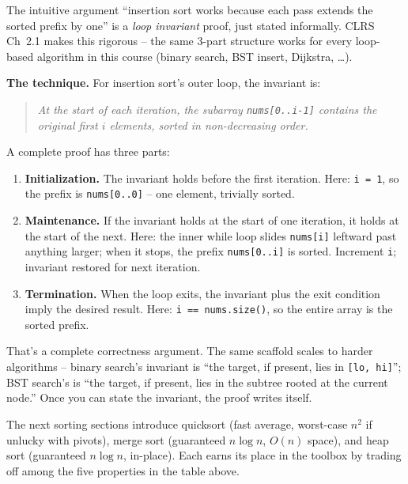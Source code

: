 \documentclass[11pt]{article}
\begin{document}
\begin{notebox}
The intuitive argument ``insertion sort works because each pass
extends the sorted prefix by one'' is a \emph{loop invariant}
proof, just stated informally. CLRS Ch~2.1 makes this rigorous --
the same 3-part structure works for every loop-based algorithm in
this course (binary search, BST insert, Dijkstra, \ldots).

\textbf{The technique.} For insertion sort's outer loop, the
invariant is:

\begin{quote}
\emph{At the start of each iteration, the subarray
\texttt{nums[0..i-1]} contains the original first $i$ elements,
sorted in non-decreasing order.}
\end{quote}

A complete proof has three parts:
\begin{enumerate}[leftmargin=*,noitemsep]
  \item \textbf{Initialization.} The invariant holds before the
        first iteration. Here: \texttt{i = 1}, so the prefix is
        \texttt{nums[0..0]} -- one element, trivially sorted.
  \item \textbf{Maintenance.} If the invariant holds at the start
        of one iteration, it holds at the start of the next. Here:
        the inner while loop slides \texttt{nums[i]} leftward past
        anything larger; when it stops, the prefix
        \texttt{nums[0..i]} is sorted. Increment \texttt{i};
        invariant restored for next iteration.
  \item \textbf{Termination.} When the loop exits, the invariant
        plus the exit condition imply the desired result. Here:
        \texttt{i == nums.size()}, so the entire array is the
        sorted prefix.
\end{enumerate}

That's a complete correctness argument. The same scaffold scales
to harder algorithms -- binary search's invariant is ``the target,
if present, lies in \texttt{[lo, hi]}''; BST search's is ``the
target, if present, lies in the subtree rooted at the current
node.'' Once you can state the invariant, the proof writes itself.
\end{notebox}

\begin{notebox}
The next sorting sections introduce quicksort (fast average,
worst-case $n^2$ if unlucky with pivots), merge sort (guaranteed
$n \log n$, $O(n)$ space), and heap sort (guaranteed $n \log n$,
in-place). Each earns its place in the toolbox by trading off among
the five properties in the table above.
\end{notebox}
\end{document}
